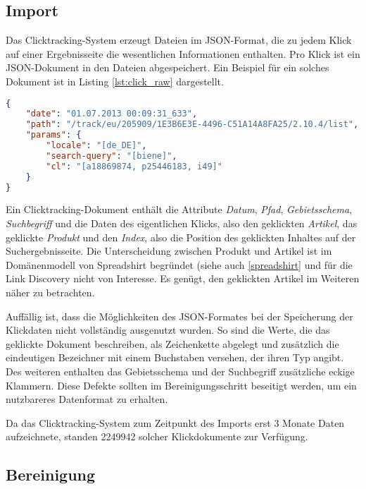 \subsection{Import}
\label{click_import}

Das Clicktracking-System erzeugt Dateien im JSON-Format, die zu jedem Klick auf einer Ergebnisseite die wesentlichen Informationen enthalten. Pro Klick ist ein JSON-Dokument in den Dateien abgespeichert. Ein Beispiel für ein solches Dokument ist in Listing \ref{lst:click_raw} dargestellt.

\begin{lstlisting}[language=json, label={lst:click_raw}, caption={Clicktracking - Rohdokument als JSON}]
{
    "date": "01.07.2013 00:09:31_633",
    "path": "/track/eu/205909/1E3B6E3E-4496-C51A14A8FA25/2.10.4/list",
    "params": {
        "locale": "[de_DE]",
        "search-query": "[biene]",
        "cl": "[a18869874, p25446183, i49]"
    }
}
\end{lstlisting}

Ein Clicktracking-Dokument enthält die Attribute \emph{Datum}, \emph{Pfad}, \emph{Gebietsschema}, \emph{Suchbegriff} und die Daten des eigentlichen Klicks, also den geklickten \emph{Artikel}, das geklickte \emph{Produkt} und den \emph{Index}, also die Position des geklickten Inhaltes auf der Suchergebnisseite. Die Unterscheidung zwischen Produkt und Artikel ist im Domänenmodell von Spreadshirt begründet (siehe auch \ref{spreadshirt} und für die Link Discovery nicht von Interesse. Es genügt, den geklickten Artikel im Weiteren näher zu betrachten.

Auffällig ist, dass die Möglichkeiten des JSON-Formates bei der Speicherung der Klickdaten nicht vollständig ausgenutzt wurden. So sind die Werte, die das geklickte Dokument beschreiben, als Zeichenkette abgelegt und zusätzlich die eindeutigen Bezeichner mit einem Buchstaben versehen, der ihren Typ angibt. Des weiteren enthalten  das Gebietsschema und der Suchbegriff zusätzliche eckige Klammern. Diese Defekte sollten im Bereinigungsschritt beseitigt werden, um ein nutzbareres Datenformat zu erhalten.

Da das Clicktracking-System zum Zeitpunkt des Imports erst 3 Monate Daten aufzeichnete, standen \num{2249942} solcher Klickdokumente zur Verfügung.

\subsection{Bereinigung}


